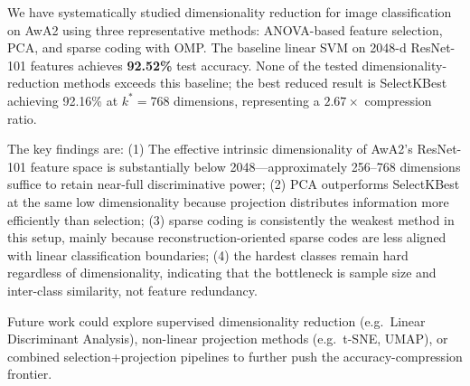 \documentclass[10pt,letterpaper]{article}
\begin{document}
We have systematically studied dimensionality reduction for image
classification on AwA2 using three representative methods: ANOVA-based
feature selection, PCA, and sparse coding with OMP.
The baseline linear SVM on 2048-d ResNet-101 features achieves
\textbf{92.52\%} test accuracy.
None of the tested dimensionality-reduction methods exceeds this baseline;
the best reduced result is SelectKBest achieving 92.16\% at
$k^* = 768$ dimensions, representing a $2.67\times$ compression ratio.

The key findings are:
(1) The effective intrinsic dimensionality of AwA2's ResNet-101 feature
space is substantially below 2048---approximately 256--768
dimensions suffice to retain near-full discriminative power;
(2) PCA outperforms SelectKBest at the same low dimensionality because
projection distributes information more efficiently than selection;
(3) sparse coding is consistently the weakest method in this setup,
mainly because reconstruction-oriented sparse codes are less aligned with
linear classification boundaries;
(4) the hardest classes remain hard regardless of dimensionality,
indicating that the bottleneck is sample size and inter-class similarity,
not feature redundancy.

Future work could explore supervised dimensionality reduction (e.g.\
Linear Discriminant Analysis), non-linear projection methods (e.g.\
t-SNE, UMAP), or combined selection+projection pipelines to further
push the accuracy-compression frontier.

{\small


}
\end{document}
